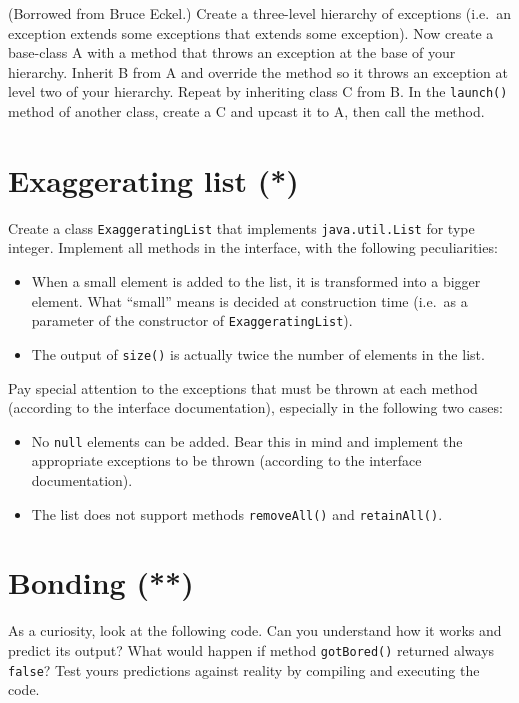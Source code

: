 \documentclass{article}
\begin{document}
(Borrowed from Bruce Eckel.) Create a three-level hierarchy of
exceptions (i.e.~an exception extends some exceptions that extends
some exception). Now create a base-class A with a method that throws an
exception at the base of your hierarchy. Inherit B from A and override
the method so it throws an exception at level two of your
hierarchy. Repeat by inheriting class C from B. In the \verb+launch()+
method of another class, create a C
and upcast it to A, then call the method.

\section{Exaggerating list (*)}
\label{sec:exaggerating-list}

Create a class \verb+ExaggeratingList+ that implements 
\verb+java.util.List+ for type integer. 
Implement all methods in the interface, with
the following peculiarities: 

\begin{itemize}
\item When a small element is added to the list, it is transformed
  into a bigger element. What ``small'' means is decided at
  construction time (i.e.~as a parameter of the constructor of
  \verb+ExaggeratingList+).
\item The output of \verb+size()+ is actually twice the number of
  elements in the list.
\end{itemize}

Pay special attention to the exceptions that must be thrown at each
method (according to the interface documentation), especially in the
following two cases:

\begin{itemize}
\item No \verb+null+ elements can be added. Bear this in mind and
  implement the appropriate exceptions to be thrown (according to the
  interface documentation).
\item The list does not support methods \verb+removeAll()+ and
  \verb+retainAll()+. 
\end{itemize}


\section{Bonding (**)}

As a curiosity, look at the following code. Can you understand how it
works and predict its output? What would happen if method
\verb+gotBored()+ returned always \verb+false+? Test yours predictions
against reality by compiling and executing the code. 
\end{document}
